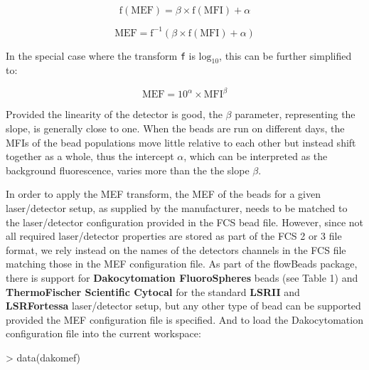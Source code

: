 \documentclass[11pt]{article}
\newcommand{\Rpackage}[1]{{\textsf{#1}}}
\begin{document}
\[
\text{f}(\text{MEF}) = \beta \times \text{f}(\text{MFI}) + \alpha
\]

\[
\text{MEF} = \text{f}^{-1} ( \beta \times \text{f}(\text{MFI}) + \alpha )
\]

In the special case where the transform \texttt{f} is $\text{log}_{10}$, this can be further simplified to:

\[
\text{MEF} = 10^\alpha \times \text{MFI}^\beta 
\]


Provided the linearity of the detector is good, the $\beta$ parameter, representing the slope, is generally close to one.
When the beads are run on different days, the MFIs of the bead populations move little relative to each other but instead shift together as a whole,
thus the intercept $\alpha$, which can be interpreted as the background fluorescence, varies more than the the slope $\beta$.

In order to apply the MEF transform, the MEF of the beads for a given laser/detector setup, as supplied by the manufacturer, 
needs to be matched to the laser/detector configuration provided in the FCS bead file.
However, since not all required laser/detector properties are stored as part of the FCS 2 or 3 file format,
we rely instead on the names of the detectors channels in the FCS file matching those in the MEF configuration file.
As part of the \Rpackage{flowBeads} package,
there is support for 
\textbf{Dakocytomation FluoroSpheres} beads (see Table 1)
and
\textbf{ThermoFischer Scientific Cytocal} 
for the standard \textbf{LSRII} and \textbf{LSRFortessa} laser/detector setup,
but any other type of bead can be supported provided the MEF configuration file is specified.
\noindent
And to load the Dakocytomation configuration file into the current workspace:
\begin{Schunk}
\begin{Sinput}
> data(dakomef)
\end{Sinput}
\end{Schunk}
\end{document}
